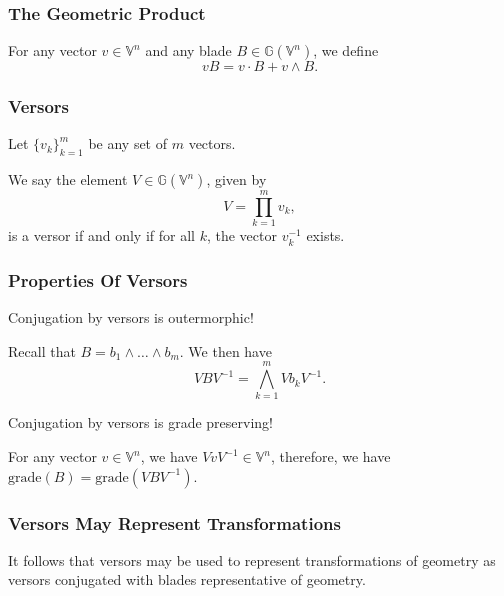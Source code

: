 \documentclass{beamer}
\newcommand{\G}{\mathbb{G}}
\newcommand{\V}{\mathbb{V}}
\newcommand{\grade}{\mbox{grade}}
\begin{document}
\begin{frame}
\frametitle{The Geometric Product}
\begin{definition}
For any vector $v\in\V^n$ and any blade $B\in\G(\V^n)$, we define
\begin{equation*}
vB = v\cdot B + v\wedge B.
\end{equation*}
\end{definition}
\end{frame}

\begin{frame}
\frametitle{Versors}
Let $\{v_k\}_{k=1}^m$ be any set of $m$ vectors.
\begin{definition}
We say the element $V\in\G(\V^n)$, given by
\begin{equation*}
V = \prod_{k=1}^m v_k,
\end{equation*}
is a versor if and only if for all $k$, the vector $v_k^{-1}$ exists.
\end{definition}
\end{frame}

\begin{frame}
\frametitle{Properties Of Versors}
Conjugation by versors is \alert{outermorphic}!

Recall that $B=b_1\wedge\dots\wedge b_m$.
We then have
\begin{equation*}
VBV^{-1} = \bigwedge_{k=1}^m Vb_kV^{-1}.
\end{equation*}

Conjugation by versors is \alert{grade preserving}!

For any vector $v\in\V^n$, we have $VvV^{-1}\in\V^n$,
therefore, we have $\grade(B)=\grade(VBV^{-1})$.

\end{frame}

\begin{frame}
\frametitle{Versors May Represent Transformations}
It follows that versors may be used to represent transformations
of geometry as versors conjugated with blades representative of geometry.
\end{frame}
\end{document}

